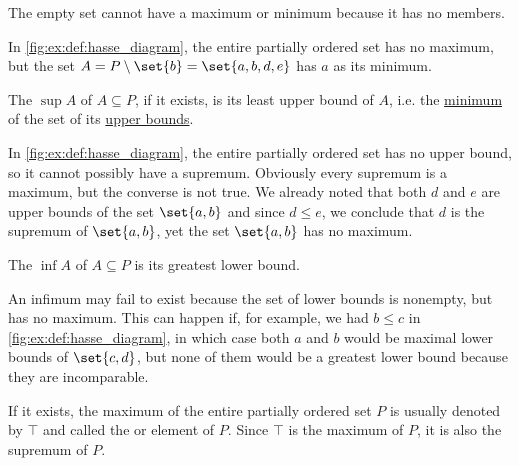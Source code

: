 \begin{definition}
\begin{thmenum}
\begin{minipage}[t]{0.45\textwidth}
      The empty set cannot have a maximum or minimum because it has no members.

      In \cref{fig:ex:def:hasse_diagram}, the entire partially ordered set has no maximum, but the set \( A = P \setminus \set{ b } = \set{ a, b, d, e } \) has \( a \) as its minimum.
    \end{minipage}

    \begin{minipage}[t]{0.45\textwidth}
      The  \( \sup A \) of \( A \subseteq P \), if it exists, is its least upper bound of \( A \), i.e. the \hyperref[def:partially_ordered_set_extremal_points/maximum_and_minimum]{minimum} of the set of its \hyperref[def:partially_ordered_set_extremal_points/upper_and_lower_bounds]{upper bounds}.

      In \cref{fig:ex:def:hasse_diagram}, the entire partially ordered set has no upper bound, so it cannot possibly have a supremum. Obviously every supremum is a maximum, but the converse is not true. We already noted that both \( d \) and \( e \) are upper bounds of the set \( \set{ a, b } \) and since \( d \leq e \), we conclude that \( d \) is the supremum of \( \set{ a, b } \), yet the set \( \set{ a, b } \) has no maximum.
    \end{minipage}
    \hspace{0.02\textwidth}
    \begin{minipage}[t]{0.45\textwidth}
      The  \( \inf A \) of \( A \subseteq P \) is its greatest lower bound.

      An infimum may fail to exist because the set of lower bounds is nonempty, but has no maximum. This can happen if, for example, we had \( b \leq c \) in \cref{fig:ex:def:hasse_diagram}, in which case both \( a \) and \( b \) would be maximal lower bounds of \( \set{ c, d } \), but none of them would be a greatest lower bound because they are incomparable.
    \end{minipage}

    \begin{minipage}[t]{0.45\textwidth}
      If it exists, the maximum of the entire partially ordered set \( P \) is usually denoted by \( \top \) and called the  or  element of \( P \). Since \( \top \) is the maximum of \( P \), it is also the supremum of \( P \).


\end{minipage}
\end{thmenum}
\end{definition}
